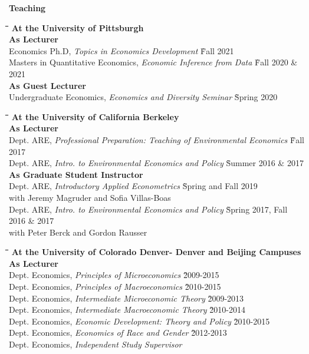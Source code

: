 \documentclass[10pt, oneside]{article}
\newcommand\mytabs{\hspace*{1cm}\=\hspace{1cm}\=\hspace{1cm}\=\hspace{1cm}\=\hspace{1cm}\=\hspace{1cm}\=\hspace{1cm}\=\hspace{1cm}\=\hspace{1cm}\=\hspace{1cm}}
\newenvironment{mysec}[1][\mytabs]
  {\begin{tabbing}#1\kill\ignorespaces}
  {\end{tabbing}}
\begin{document}
\begin{minipage}[t]{0.1\linewidth}
\textbf{Teaching}
\end{minipage}\hspace{0.05\linewidth}
\begin{minipage}[t]{0.8\linewidth}
\begin{mysec} 
\textbf{At the University of Pittsburgh} \\
\>\textbf{As Lecturer} \\
\>\>Economics Ph.D, \emph{Topics  in Economics Development}  \`Fall 2021\\
\>\>Masters in Quantitative Economics, \emph{Economic Inference from Data}  \`Fall 2020 \& 2021\\
\>\textbf{As Guest Lecturer} \\
\>\>Undergraduate Economics, \emph{Economics and Diversity Seminar}  \`Spring 2020\\
\end{mysec}
\begin{mysec} 
\textbf{At the University of California Berkeley} \\
\>\textbf{As Lecturer} \\
\>\>Dept. ARE, \emph{Professional Preparation: Teaching of Environmental Economics}  \`Fall 2017 \\
\>\>Dept. ARE, \emph{Intro. to Environmental Economics and Policy}  \` Summer 2016 \& 2017 \\
\>\textbf{As Graduate Student Instructor} \\
\>\>Dept. ARE, \emph{Introductory Applied Econometrics}  \` Spring and Fall 2019 \\
\>\>\> with Jeremy Magruder and Sofia Villas-Boas\\
\>\>Dept. ARE, \emph{Intro. to Environmental Economics and Policy}  \` Spring 2017, Fall 2016 \& 2017 \\
\>\>\> with Peter Berck and Gordon Rausser
\end{mysec}
\begin{mysec} 
\textbf{At the University of Colorado Denver- Denver and Beijing Campuses} \\
\>\textbf{As Lecturer} \\
\>\>Dept. Economics, \emph{Principles of Microeconomics}  \`2009-2015 \\
\>\>Dept. Economics, \emph{Principles of Macroeconomics}  \`2010-2015\\
\>\>Dept. Economics, \emph{Intermediate Microeconomic Theory}  \`2009-2013\\
\>\>Dept. Economics, \emph{Intermediate Macroeconomic Theory}  \`2010-2014\\
\>\>Dept. Economics, \emph{Economic Development: Theory and Policy}  \`2010-2015\\
\>\>Dept. Economics, \emph{Economics of Race and Gender}  \`2012-2013\\
\>\>Dept. Economics, \emph{Independent Study Supervisor}  
\end{mysec}
\end{minipage}\vspace{5mm}
\end{document}
